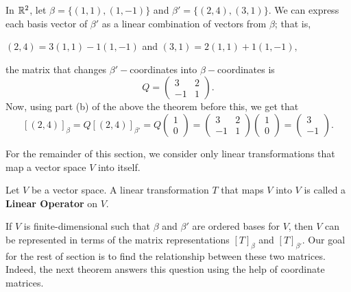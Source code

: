 \begin{eg}\label{Example 2.5.1}
    In \(  \mathbb{R}^{2} \), let \( \beta = \{ (1,1), (1,-1) \}  \) and \( \beta' = \{ (2,4), (3,1) \}  \). We can express each basis vector of \( \beta'  \) as a linear combination of vectors from \( \beta \); that is, 
    \begin{center}
        \( (2,4) = 3(1,1) - 1(1,-1) \) and \( (3,1) = 2(1,1) + 1(1,-1), \)
    \end{center} the matrix that changes \( \beta'- \)coordinates into \( \beta- \)coordinates is 
    \[ Q = \begin{pmatrix}
        3 & 2 \\
        -1 & 1 
    \end{pmatrix}.  \]
    Now, using part (b) of the above the theorem before this, we get that
    \[  [(2,4)]_{\beta} = Q [(2,4)]_{\beta'} = Q \begin{pmatrix}
        1 \\
        0
    \end{pmatrix} = \begin{pmatrix}
    3 & 2 \\
    -1 & 1 
    \end{pmatrix} \begin{pmatrix}
        1 \\
        0
    \end{pmatrix} = \begin{pmatrix}
        3 \\
        -1
    \end{pmatrix}. \]
\end{eg}

For the remainder of this section, we consider only linear transformations that map a vector space \( V  \) into itself. 

\begin{definition}
    Let \( V  \) be a vector space. A linear transformation \( T \) that maps \( V  \) into \( V  \) is called a \textbf{Linear Operator} on \( V  \).
\end{definition}

If \( V  \) is finite-dimensional such that \( \beta \) and \( \beta'  \) are ordered bases for \( V  \), then \( V  \) can be represented in terms of the matrix representations \( [T]_{\beta} \) and \( [T]_{\beta'} \). Our goal for the rest of section is to find the relationship between these two matrices. Indeed, the next theorem answers this question using the help of coordinate matrices.

